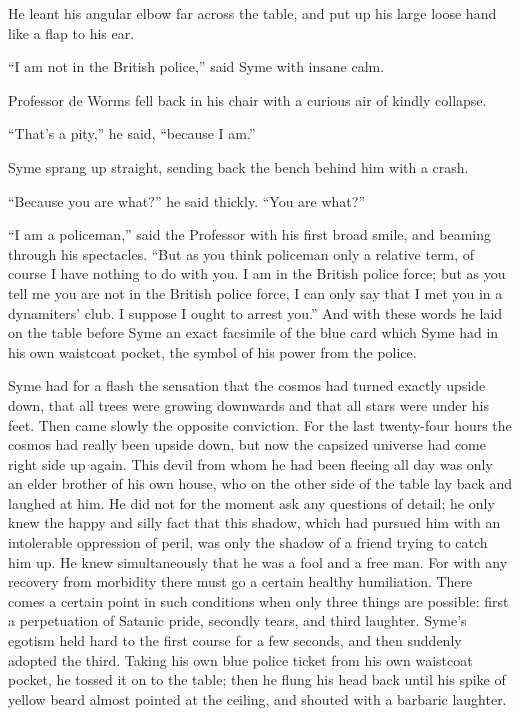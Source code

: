 \documentclass{book}
\begin{document}
He leant his angular elbow far across the table, and put up his large loose hand like a flap to his ear.

“I am not in the British police,” said Syme with insane calm.

Professor de Worms fell back in his chair with a curious air of kindly collapse.

“That’s a pity,” he said, “because I am.”

Syme sprang up straight, sending back the bench behind him with a crash.

“Because you are what?” he said thickly. “You are what?”

“I am a policeman,” said the Professor with his first broad smile, and beaming through his spectacles. “But as you think policeman only a relative term, of course I have nothing to do with you. I am in the British police force; but as you tell me you are not in the British police force, I can only say that I met you in a dynamiters’ club. I suppose I ought to arrest you.” And with these words he laid on the table before Syme an exact facsimile of the blue card which Syme had in his own waistcoat pocket, the symbol of his power from the police.

Syme had for a flash the sensation that the cosmos had turned exactly upside down, that all trees were growing downwards and that all stars were under his feet. Then came slowly the opposite conviction. For the last twenty-four hours the cosmos had really been upside down, but now the capsized universe had come right side up again. This devil from whom he had been fleeing all day was only an elder brother of his own house, who on the other side of the table lay back and laughed at him. He did not for the moment ask any questions of detail; he only knew the happy and silly fact that this shadow, which had pursued him with an intolerable oppression of peril, was only the shadow of a friend trying to catch him up. He knew simultaneously that he was a fool and a free man. For with any recovery from morbidity there must go a certain healthy humiliation. There comes a certain point in such conditions when only three things are possible: first a perpetuation of Satanic pride, secondly tears, and third laughter. Syme’s egotism held hard to the first course for a few seconds, and then suddenly adopted the third. Taking his own blue police ticket from his own waistcoat pocket, he tossed it on to the table; then he flung his head back until his spike of yellow beard almost pointed at the ceiling, and shouted with a barbaric laughter.
\end{document}
